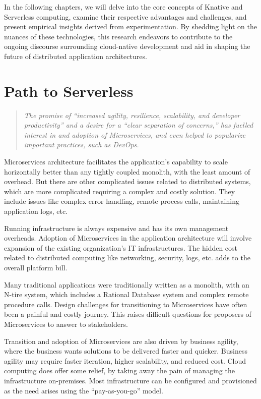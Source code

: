 \documentclass[12pt]{article}
\begin{document}
\begin{flushleft}
In the following chapters, we will delve into the core concepts of Knative and Serverless computing, examine their respective advantages and challenges, and present empirical insights derived from experimentation. By shedding light on the nuances of these technologies, this research endeavors to contribute to the ongoing discourse surrounding cloud-native development and aid in shaping the future of distributed application architectures.
\end{flushleft}
\pagebreak


\section{Path to Serverless}
\begin{flushleft}
\begin{quote}
    \textit{The promise of “increased agility, resilience, scalability, and developer productivity” and a desire for a “clear separation of concerns,” has fuelled interest in and adoption of Microservices, and even helped to popularize important practices, such as DevOps.}\\
    \cite{KillaleaTom-2016}
\end{quote}
Microservices architecture facilitates the application’s capability to scale horizontally better than any tightly coupled monolith, with the least amount of overhead. But there are other complicated issues related to distributed systems, which are more complicated requiring a complex and costly solution. They include issues like complex error handling, remote process calls, maintaining application logs, etc.

Running infrastructure is always expensive and has its own management overheads. Adoption of Microservices in the application architecture will involve expansion of the existing organization’s IT infrastructures. The hidden cost related to distributed computing like networking, security, logs, etc. adds to the overall platform bill.

Many traditional applications were traditionally written as a monolith, with an N-tire system, which includes a Rational Database system and complex remote procedure calls. Design challenges for transitioning to Microservices have often been a painful and costly journey. This raises difficult questions for proposers of Microservices to answer to stakeholders.

Transition and adoption of Microservices are also driven by business agility, where the business wants solutions to be delivered faster and quicker. Business agility may require faster iteration, higher scalability, and reduced cost. 
Cloud computing does offer some relief, by taking away the pain of managing the infrastructure on-premises. Most infrastructure can be configured and provisioned as the need arises using the “pay-as-you-go” model. 


\end{flushleft}
\end{document}
